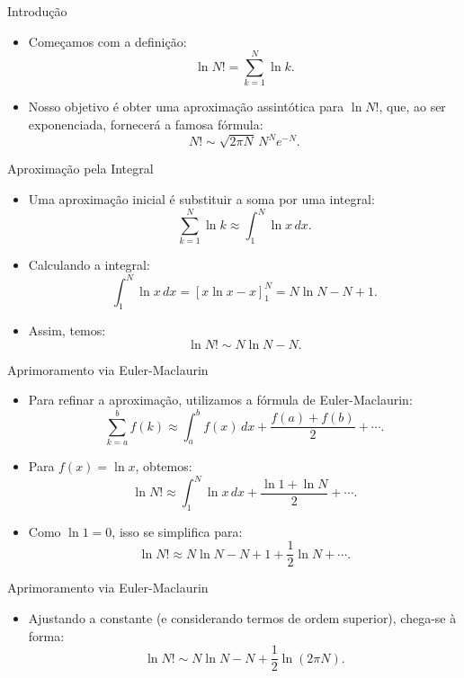 \documentclass[11pt]{beamer}
\begin{document}
\begin{frame}{Introdução}
  \begin{itemize}
    \item Começamos com a definição:
      \[
      \ln N! = \sum_{k=1}^{N} \ln k.
      \]
    \item Nosso objetivo é obter uma aproximação assintótica para $\ln N!$, que, ao ser exponenciada, fornecerá a famosa fórmula:
      \[
      N! \sim \sqrt{2\pi N}\, N^N e^{-N}.
      \]
  \end{itemize}
\end{frame}

\begin{frame}{Aproximação pela Integral}
  \begin{itemize}
    \item Uma aproximação inicial é substituir a soma por uma integral:
      \[
      \sum_{k=1}^{N} \ln k \approx \int_{1}^{N} \ln x\,dx.
      \]
    \item Calculando a integral:
      \[
      \int_{1}^{N} \ln x\,dx = \left[ x\ln x - x \right]_1^N = N\ln N - N + 1.
      \]
    \item Assim, temos:
      \[
      \ln N! \sim N\ln N - N.
      \]
  \end{itemize}
\end{frame}

\begin{frame}{Aprimoramento via Euler-Maclaurin}
  \begin{itemize}
    \item Para refinar a aproximação, utilizamos a fórmula de Euler-Maclaurin:
      \[
      \sum_{k=a}^{b} f(k) \approx \int_{a}^{b} f(x)\,dx + \frac{f(a)+f(b)}{2} + \cdots.
      \]
    \item Para $f(x)=\ln x$, obtemos:
      \[
      \ln N! \approx \int_{1}^{N} \ln x\,dx + \frac{\ln 1 + \ln N}{2} + \cdots.
      \]
    \item Como $\ln 1=0$, isso se simplifica para:
      \[
      \ln N! \approx N\ln N - N + 1 + \frac{1}{2}\ln N + \cdots.
      \]

  \end{itemize}
\end{frame}
      
\begin{frame}{Aprimoramento via Euler-Maclaurin}
  \begin{itemize}
    \item Ajustando a constante (e considerando termos de ordem superior), chega-se à forma:
      \[
      \ln N! \sim N\ln N - N + \frac{1}{2}\ln(2\pi N).
      \]
  \end{itemize}
\end{frame}
\end{document}
